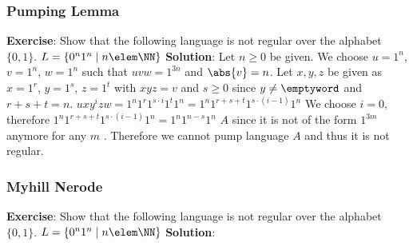 

    \newpage
    
    \subsubsection{Pumping Lemma}
    \textbf{Exercise}:\newline
    Show that the following language is not regular over the alphabet $ \{0,1\} $.\newline
    $L=\{0^n 1^n \mid n \elem \NN \}$\newline\newline
    \textbf{Solution}:\newline
    Let $n \geq 0$ be given.\newline
    We choose $u=1^n$, $v=1^n$, $w=1^n$ such that $uvw=1^{3n}$ and $\abs{v}=n$.\newline
    Let $x,y,z$ be given as $x=1^r$, $y=1^s$, $z=1^t$ with $xyz=v$ and $s \ge 0$ since $y \neq \emptyword$ and $r+s+t=n$.\newline
    $uxy^izw=1^n 1^r 1^{s \cdot i} 1^t 1^n=1^n 1^{r+s+t} 1^{s \cdot (i-1)} 1^n$\newline
    We choose $i=0$, therefore $1^n 1^{r+s+t} 1^{s \cdot (i-1)} 1^n = 1^n 1^{n-s} 1^n$ \notelem $A$ since it is not of the form $1^{3m}$ anymore for any $m$ \elem \NN.\newline
    Therefore we cannot pump language $A$ and thus it is not regular.\newline


    \subsubsection{Myhill Nerode}
    \textbf{Exercise}:\newline
    Show that the following language is not regular over the alphabet $ \{0,1\} $.\newline
    $L=\{0^n 1^n \mid n \elem \NN \}$\newline\newline
    \textbf{Solution}:\newline
